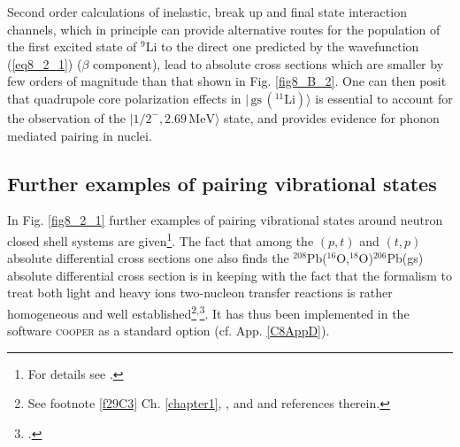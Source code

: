  Second order calculations of inelastic, break up and final state interaction channels, which in principle can provide alternative routes for the population of the first excited state of $^9$Li  to the direct one predicted by the wavefunction (\ref{eq8_2_1})  ($\beta$ component), lead to absolute cross sections which are smaller by few orders of magnitude than that shown in Fig. \ref{fig8_B_2}. One  can then posit that quadrupole core polarization effects in $|\,\text{gs}\,(^{11}\text{Li})\rangle$ is essential to account for the observation of the $|1/2^-,2.69\,\text{MeV}\rangle$ state, and provides evidence for phonon mediated pairing in nuclei. 

 \subsection{Further examples of pairing vibrational states}\label{C6S1.2}
 In Fig. \ref{fig8_2_1} further examples of pairing vibrational states around  neutron closed shell systems are given\footnote{For details see \cite{Potel:13}.}. The fact that among the $(p,t)$ and $(t,p)$ absolute differential cross sections one also finds the $^{208}$Pb($^{16}$O,$^{18}$O)$^{206}$Pb(gs) absolute differential cross section is in keeping with the fact that the formalism to treat both light and heavy ions two-nucleon transfer reactions is rather homogeneous and well established\footnote{See footnote \ref{f29C3}  Ch. \ref{chapter1}, \cite{Bayman:82}, \cite{Broglia:04a}  and  \cite{Thompson:88} and references therein.}$^,$\footnote{\cite{Potel:13,Potel:13b}.}.  It has thus been implemented in the software \textsc{cooper} as a standard option (cf. App. \ref{C8AppD}). 

